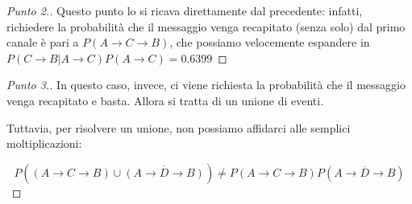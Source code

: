 \documentclass{beamer}
\renewcommand\qedsymbol{$\blacksquare$}
\begin{document}
\begin{frame}
	\begin{proof}[Punto 2.]
		Questo punto lo si ricava direttamente dal precedente: infatti, richiedere la probabilità che il messaggio venga recapitato (senza solo) dal primo canale è pari a $P(A \rightarrow C \rightarrow B)$, che possiamo velocemente espandere in $P(C \rightarrow B|A \rightarrow C)P(A \rightarrow C) = 0.6399$ \qedhere
	\end{proof}
\end{frame}


\begin{frame}
	\begin{proof}[Punto 3.]\renewcommand{\qedsymbol}{$\longrightarrow$}
		In questo caso, invece, ci viene richiesta la probabilità che il messaggio venga recapitato e basta. Allora si tratta di un unione di eventi.

		Tuttavia, per risolvere un unione, non possiamo affidarci alle semplici moltiplicazioni:

		\[
			P((A \rightarrow C \rightarrow B) \cup \overline{(A \rightarrow D \rightarrow B)}) \ne P(A \rightarrow C \rightarrow B)P(\overline{A \rightarrow D \rightarrow B})
		\] \qedhere
	\end{proof}
\end{frame}
\end{document}
